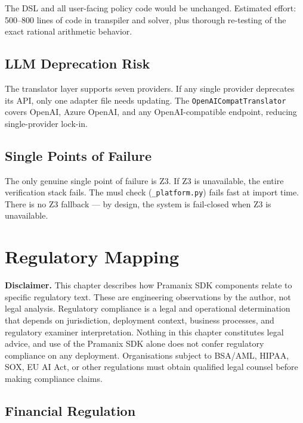 \documentclass[12pt,a4paper,oneside]{report}
\newcommand{\fname}[1]{\texttt{#1}}          %
\newcommand{\code}[1]{\texttt{#1}}           %
\begin{document}
The DSL and all user-facing policy code would be unchanged. Estimated effort:
500--800 lines of code in transpiler and solver, plus thorough re-testing of
the exact rational arithmetic behavior.

\section{LLM Deprecation Risk}

The translator layer supports seven providers. If any single provider
deprecates its API, only one adapter file needs updating. The
\code{OpenAICompatTranslator} covers OpenAI, Azure OpenAI, and any
OpenAI-compatible endpoint, reducing single-provider lock-in.

\section{Single Points of Failure}

The only genuine single point of failure is Z3. If Z3 is unavailable, the
entire verification stack fails. The musl check (\fname{\_platform.py}) fails
fast at import time. There is no Z3 fallback --- by design, the system is
fail-closed when Z3 is unavailable.

\chapter{Regulatory Mapping}

\textbf{Disclaimer.}  This chapter describes how Pramanix SDK components
relate to specific regulatory text.  These are engineering observations by
the author, not legal analysis.  Regulatory compliance is a legal and
operational determination that depends on jurisdiction, deployment context,
business processes, and regulatory examiner interpretation.  Nothing in this
chapter constitutes legal advice, and use of the Pramanix SDK alone does not
confer regulatory compliance on any deployment.  Organisations subject to
BSA/AML, HIPAA, SOX, EU AI Act, or other regulations must obtain qualified
legal counsel before making compliance claims.

\section{Financial Regulation}
\end{document}
